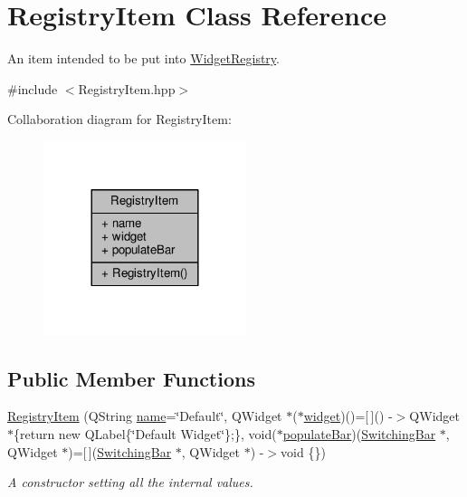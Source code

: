 \hypertarget{class_registry_item}{}\section{Registry\+Item Class Reference}
\label{class_registry_item}


An item intended to be put into \hyperlink{class_widget_registry}{Widget\+Registry}.  




{\ttfamily \#include $<$Registry\+Item.\+hpp$>$}



Collaboration diagram for Registry\+Item\+:
\nopagebreak
\begin{figure}[H]
\begin{center}
\leavevmode
\includegraphics[width=168pt]{class_registry_item__coll__graph}
\end{center}
\end{figure}
\subsection*{Public Member Functions}
\begin{DoxyCompactItemize}
\item 
\hyperlink{class_registry_item_a6a4c02c5562dc8cbc61bee94f7a8db49}{Registry\+Item} (Q\+String \hyperlink{class_registry_item_a662d7e2c473bea72a0549caf63ea5bfd}{name}=\char`\"{}Default\char`\"{}, Q\+Widget $\ast$($\ast$\hyperlink{class_registry_item_aa95c5a5dbfdf491e53b07dbc0a027e14}{widget})()=\mbox{[}$\,$\mbox{]}() -\/$>$Q\+Widget $\ast$\{return new Q\+Label\{\char`\"{}Default Widget\char`\"{}\};\}, void($\ast$\hyperlink{class_registry_item_a0784869b48c86a581e12c88fd2706cd0}{populate\+Bar})(\hyperlink{class_switching_bar}{Switching\+Bar} $\ast$, Q\+Widget $\ast$)=\mbox{[}$\,$\mbox{]}(\hyperlink{class_switching_bar}{Switching\+Bar} $\ast$, Q\+Widget $\ast$) -\/$>$void \{\})
\begin{DoxyCompactList}\small\item\em A constructor setting all the internal values. \end{DoxyCompactList}\end{DoxyCompactItemize}
